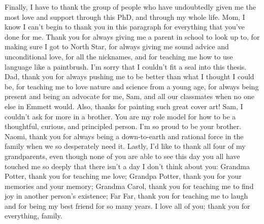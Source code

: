 Finally, I have to thank the group of people who have undoubtedly given me the most love and support through this PhD, and through my whole life.
Mom, I know I can't begin to thank you in this paragraph for everything that you've done for me.
Thank you for always giving me a parent in school to look up to, for making sure I got to North Star, for always giving me sound advice and unconditional love, for all the nicknames, and for teaching me how to use language like a paintbrush.
I'm sorry that I couldn't fit a seal into this thesis.
Dad, thank you for always pushing me to be better than what I thought I could be, for teaching me to love nature and science from a young age, for always being present and being an advocate for me, Sam, and all our classmates when no one else in Emmett would.
Also, thanks for painting such great cover art!
Sam, I couldn't ask for more in a brother.
You are my role model for how to be a thoughtful, curious, and principled person.
I'm so proud to be your brother.
Naomi, thank you for always being a down-to-earth and rational force in the family when we so desperately need it.
Lastly, I'd like to thank all four of my grandparents, even though none of you are able to see this day you all have touched me so deeply that there isn't a day I don't think about you: Grandma Potter, thank you for teaching me love; Grandpa Potter, thank you for your memories and your memory; Grandma Carol, thank you for teaching me to find joy in another person's existence; Far Far, thank you for teaching me to laugh and for being my best friend for so many years.
I love all of you; thank you for everything, family.

\cleardoublepage

